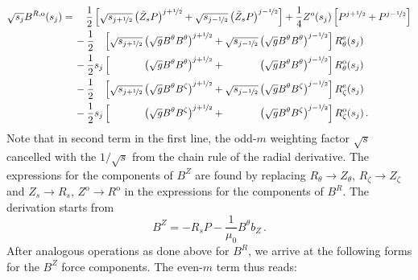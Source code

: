\begin{align}
  \sqrt{s_j} B^{R,\mathrm{o}} (s_j)
  =&\, \phantom{-}~ \frac{1}{2} \left[ \sqrt{s_{j+\half}} \left( \tilde{Z}_s P \right)^{j+\half} + \sqrt{s_{j-\half}} \left( \tilde{Z}_s P \right)^{j-\half} \right]
    + \frac{1}{4} Z^o(s_j) \left[ P^{j+\half} + P^{j-\half} \right] \nonumber \\
  ~&\, - \frac{1}{2} \phantom{s_j} \left[            \sqrt{s_{j+\half}}  \left( \sqrt{g} B^\theta B^\theta \right)^{j+\half}
                                          +          \sqrt{s_{j-\half}}  \left( \sqrt{g} B^\theta B^\theta \right)^{j-\half} \right] R_\theta^\mathrm{e}(s_j) \nonumber \\
  ~&\, - \frac{1}{2}          s_j  \left[   \phantom{\sqrt{s_{j+\half}}} \left( \sqrt{g} B^\theta B^\theta \right)^{j+\half}
                                          + \phantom{\sqrt{s_{j-\half}}} \left( \sqrt{g} B^\theta B^\theta \right)^{j-\half} \right] R_\theta^\mathrm{o}(s_j) \nonumber \\
  ~&\, - \frac{1}{2} \phantom{s_j} \left[            \sqrt{s_{j+\half}}  \left( \sqrt{g} B^\theta  B^\zeta \right)^{j+\half}
                                          +          \sqrt{s_{j-\half}}  \left( \sqrt{g} B^\theta  B^\zeta \right)^{j-\half} \right]  R_\zeta^\mathrm{e}(s_j) \nonumber \\
  ~&\, - \frac{1}{2}          s_j  \left[   \phantom{\sqrt{s_{j+\half}}} \left( \sqrt{g} B^\theta  B^\zeta \right)^{j+\half}
                                          + \phantom{\sqrt{s_{j-\half}}} \left( \sqrt{g} B^\theta  B^\zeta \right)^{j-\half} \right]  R_\zeta^\mathrm{o}(s_j) \label{eqn:brmn_o} \, .
\end{align}
Note that in second term in the first line, the odd-$m$ weighting factor $\sqrt{s}$ cancelled with the $1/\sqrt{s}$ from the chain rule
of the radial derivative.
The expressions for the components of $B^Z$ are found by replacing
$R_\theta \rightarrow Z_\theta$, $R_\zeta \rightarrow Z_\zeta$ and $Z_s \rightarrow R_s$, $Z^\mathrm{o} \rightarrow R^\mathrm{o}$
in the expressions for the components of $B^R$.
The derivation starts from
\begin{equation}
  B^Z = -R_s P - \frac{1}{\mu_0} B^\theta b_Z \, .
\end{equation}
After analogous operations as done above for $B^R$, we arrive at the following forms for the $B^Z$ force components.
The even-$m$ term thus reads:
